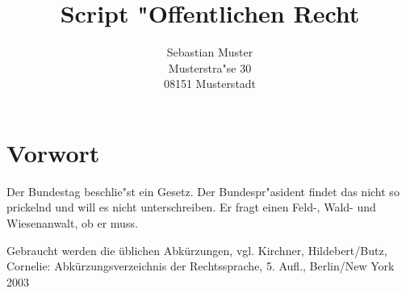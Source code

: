 \begingroup

\title{Script "Offentlichen Recht}

\author{Sebastian Muster\\Musterstra"se 30\\08151 Musterstadt}

\begin{titlepage}

\makeatletter
\noindent\@author\hfill\@date
\makeatother

\vspace{3cm}

\begin{center}

{%
\bfseries\hrulefill

\makeatletter
\Huge\@title
\makeatother


\hrulefill}

\end{center}
\end{titlepage}

\chapter*{Vorwort}
Der Bundestag beschlie"st ein Gesetz. Der Bundespr"asident findet das nicht so prickelnd und will es nicht
unterschreiben. Er fragt einen Feld-, Wald- und Wiesenanwalt, ob er muss.
\clearpage

\setcounter{tocdepth}{3}
\tableofcontents

\nocite{*} %


Gebraucht werden die üblichen Abkürzungen, vgl. Kirchner,
Hildebert/Butz, Cornelie: Abkürzungsverzeichnis der Rechtssprache, 5.
Aufl., Berlin/New York 2003

\clearpage

\endgroup